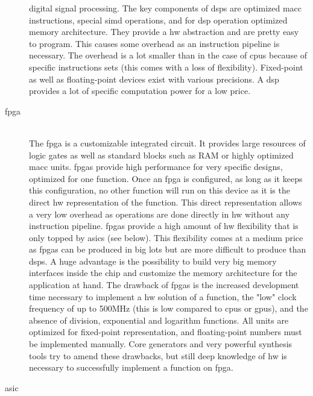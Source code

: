 \documentclass[mscthesis]{usiinfthesis}
\begin{document}
\begin{description}
        digital signal processing. The key components of \glspl{dsp} are
        optimized \gls{macc} instructions, special \gls{simd}
        operations, and for \gls{dsp} operation optimized memory architecture.
        They provide a \gls{hw} abstraction and are pretty easy to program.
        This causes some overhead as an instruction pipeline is necessary. The
        overhead is a lot smaller than in the case of \glspl{cpu} because of
        specific instructions sets (this comes with a loss of flexibility).
        Fixed-point as well as floating-point devices exist with various
        precisions. A \gls{dsp} provides a lot of specific computation power
        for a low price.
    \item[\acrshort{fpga}] \hfill \\
        The \acrfull{fpga} is a customizable integrated circuit. It provides
        large resources of logic gates as well as standard blocks such as RAM
        or highly optimized \gls{macc} units. \glspl{fpga} provide
        high performance for very specific designs, optimized for one function.
        Once an \gls{fpga} is configured, as long as it keeps this
        configuration, no other function will run on this device as it is the
        direct \gls{hw} representation of the function. This direct
        representation allows a very low overhead as operations are done
        directly in \gls{hw} without any instruction pipeline. \glspl{fpga}
        provide a high amount of \gls{hw} flexibility that is only topped by
        \glspl{asic} (see below). This flexibility comes at a medium price as
        \glspl{fpga} can be produced in big lots but are more difficult to
        produce than \glspl{dsp}. A huge advantage is the possibility to
        build very big memory interfaces inside the chip and customize the
        memory architecture for the application at hand. The drawback of
        \glspl{fpga} is the increased development time necessary to implement
        a \gls{hw} solution of a function, the "low" clock frequency of up to
        500MHz (this is low compared to \glspl{cpu} or \glspl{gpu}), and the
        absence of division, exponential and logarithm functions. All units are
        optimized for fixed-point representation, and floating-point numbers
        must be implemented manually. Core generators and very powerful
        synthesis tools try to amend these drawbacks, but still deep
        knowledge of \gls{hw} is necessary to successfully implement a function
        on \gls{fpga}.
    \item[\acrshort{asic}] \hfill \\

\end{description}
\end{document}
